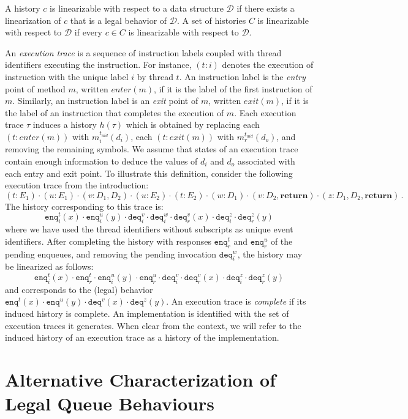 \documentclass{LMCS}
\newcommand{\enq}{\ensuremath{\mathtt{enq}}}
\newcommand{\deq}{\ensuremath{\mathtt{deq}}}
\begin{document}
\begin{defi}
A history $c$ is linearizable with respect to a data structure $\mathcal{D}$ if
there exists a linearization of $c$ that is a legal behavior of $\mathcal{D}$.
A set of histories $C$ is linearizable with respect to $\mathcal{D}$ if 
every $c\in C$ is linearizable with respect to $\mathcal{D}$.
\end{defi}
An {\em execution trace} is a sequence of instruction labels coupled with thread identifiers executing the instruction.
For instance, $(t:i)$ denotes the execution of instruction with the unique label $i$ by thread $t$.
An instruction label is the {\em entry} point of method $m$, written $enter(m)$, if it is the label of the first instruction of $m$.
Similarly, an instruction label is an {\em exit} point of $m$, written $exit(m)$, if it is the label of an instruction that completes the execution of $m$. 
Each execution trace $\tau$ induces a history $h(\tau)$ which is obtained by replacing each $(t:enter(m))$ with $m^{t_{uid}}_i(d_i)$, each $(t:exit(m))$ with $m^{t_{uid}}_r(d_o)$, and removing the remaining symbols.
We assume that states of an execution trace contain enough information to deduce the values of $d_i$ and $d_o$ associated with each entry and exit point. 
To illustrate this definition, consider the following execution trace from the introduction:
\[
(t:E_1)\cdot(u:E_1)\cdot(v:D_1,D_2)\cdot(u:E_2)\cdot(t:E_2)
       \cdot(w:D_1)\cdot(v:D_2,\textbf{return})\cdot(z:D_1,D_2,\textbf{return})
\,.
\]
The history corresponding to this trace is:
\[ 
\enq^t_i(x) \cdot \enq^u_i(y)\cdot \deq^v_i \cdot
\deq^w_i \cdot \deq^v_r(x) \cdot  \deq^z_i \cdot \deq^z_r(y)
\]
where we have used the thread identifiers without subscripts as unique event identifiers.
After completing the history with responses $\enq^t_r$ and $\enq^u_r$ of the pending enqueues, 
and removing the pending invocation $\deq^w_i$, the history may be linearized as follows:
\[
\enq^t_i(x) \cdot \enq^t_r \cdot \enq^u_i(y) \cdot \enq^u_r \cdot 
\deq^v_i\cdot \deq^v_r(x) \cdot \deq^z_i \cdot \deq^z_r(y)
\]
and corresponds to the (legal) behavior
$\enq^t(x) \cdot \enq^u(y) \cdot \deq^v(x) \cdot \deq^z(y)$.
An execution trace is {\em complete} if its induced history is complete.
An implementation is identified with the set of execution traces it generates. 
When clear from the context, we will refer to the induced history of an execution trace as a history of the implementation.

\section{Alternative Characterization of Legal Queue Behaviours}
\label{sec:seqwit}
\end{document}
